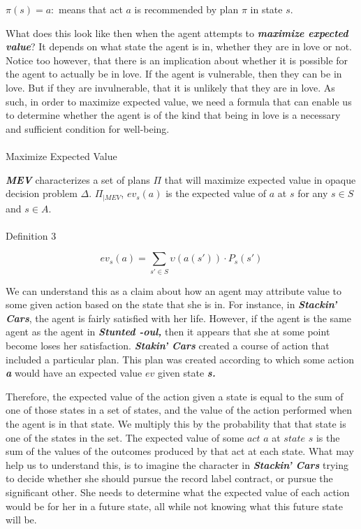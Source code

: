 \documentclass[
  letterpaper,
  DIV=11,
  numbers=noendperiod]{scrartcl}
\makeatletter
\let\oldparagraph\paragraph
\renewcommand{\paragraph}{
    \@ifstar
      \xxxParagraphStar
      \xxxParagraphNoStar
  }
\newcommand{\xxxParagraphStar}[1]{\oldparagraph*{#1}\mbox{}}
\newcommand{\xxxParagraphNoStar}[1]{\oldparagraph{#1}\mbox{}}
\makeatother
\begin{document}
\(\pi(s) = a:\) means that act \(a\) is recommended by plan \(\pi\) in
state \(s.\)

What does this look like then when the agent attempts to
\emph{\textbf{maximize expected value}}? It depends on what state the
agent is in, whether they are in love or not. Notice too however, that
there is an implication about whether it is possible for the agent to
actually be in love. If the agent is vulnerable, then they can be in
love. But if they are invulnerable, that it is unlikely that they are in
love. As such, in order to maximize expected value, we need a formula
that can enable us to determine whether the agent is of the kind that
being in love is a necessary and sufficient condition for well-being.

\paragraph{Maximize Expected Value}\label{maximize-expected-value}

\emph{\textbf{MEV}} characterizes a set of plans \(\Pi\) that will
maximize expected value in opaque decision problem \(\Delta\).
\(\Pi_{|MEV}\), \(ev_s(a)\) is the expected value of \(a\) at \(s\) for
any \(s \in S\) and \(s \in A\).

\paragraph{Definition 3}\label{definition-3}

\[  
ev_s(a) = \sum_{s' \in S} \upsilon(a(s')) \cdot P_s(s')  
\]

We can understand this as a claim about how an agent may attribute value
to some given action based on the state that she is in. For instance, in
\emph{\textbf{Stackin' Cars}}, the agent is fairly satisfied with her
life. However, if the agent is the same agent as the agent in
\emph{\textbf{Stunted -oul,}} then it appears that she at some point
become loses her satisfaction. \emph{\textbf{Stakin' Cars}} created a
course of action that included a particular plan. This plan was created
according to which some action \emph{\textbf{a}} would have an expected
value \(ev\) given state \emph{\textbf{s.}}

Therefore, the expected value of the action given a state is equal to
the sum of one of those states in a set of states, and the value of the
action performed when the agent is in that state. We multiply this by
the probability that that state is one of the states in the set. The
expected value of some \(act\) \(a\) at \(state\) \(s\) is the sum of
the values of the outcomes produced by that act at each state. What may
help us to understand this, is to imagine the character in
\emph{\textbf{Stackin' Cars}} trying to decide whether she should pursue
the record label contract, or pursue the significant other. She needs to
determine what the expected value of each action would be for her in a
future state, all while not knowing what this future state will be.
\end{document}
